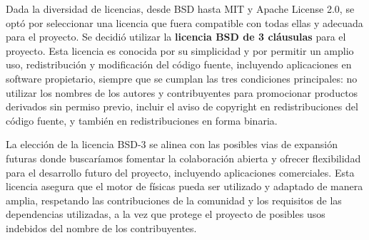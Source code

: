\newpage
Dada la diversidad de licencias, desde BSD hasta MIT y Apache License 2.0, se optó por seleccionar una licencia que fuera compatible con todas ellas y adecuada para el proyecto. Se decidió utilizar la \textbf{licencia BSD de 3 cláusulas} para el proyecto. Esta licencia es conocida por su simplicidad y por permitir un amplio uso, redistribución y modificación del código fuente, incluyendo aplicaciones en software propietario, siempre que se cumplan las tres condiciones principales: no utilizar los nombres de los autores y contribuyentes para promocionar productos derivados sin permiso previo, incluir el aviso de copyright en redistribuciones del código fuente, y también en redistribuciones en forma binaria.

La elección de la licencia BSD-3 se alinea con las posibles vias de expansión futuras donde buscaríamos fomentar la colaboración abierta y ofrecer flexibilidad para el desarrollo futuro del proyecto, incluyendo aplicaciones comerciales. Esta licencia asegura que el motor de físicas pueda ser utilizado y adaptado de manera amplia, respetando las contribuciones de la comunidad y los requisitos de las dependencias utilizadas, a la vez que protege el proyecto de posibles usos indebidos del nombre de los contribuyentes.

